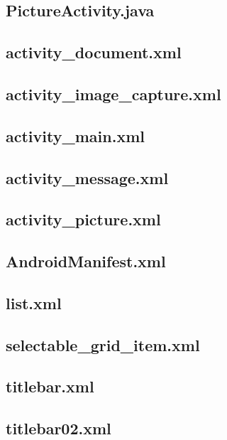 \documentclass[11pt,a4j]{jarticle}
\begin{document}
\subsection{PictureActivity.java}
	
	\newpage

\subsection{activity\_document.xml}
	
	\newpage
\subsection{activity\_image\_capture.xml}
	
	\newpage
\subsection{activity\_main.xml}
	
	\newpage
\subsection{activity\_message.xml}
	
	\newpage
\subsection{activity\_picture.xml}
	
	\newpage
\subsection{AndroidManifest.xml}
	
	\newpage
\subsection{list.xml}
	
	\newpage
\subsection{selectable\_grid\_item.xml}
	
	\newpage
\subsection{titlebar.xml}
	
	\newpage
\subsection{titlebar02.xml}
	
	\newpage
\end{document}
